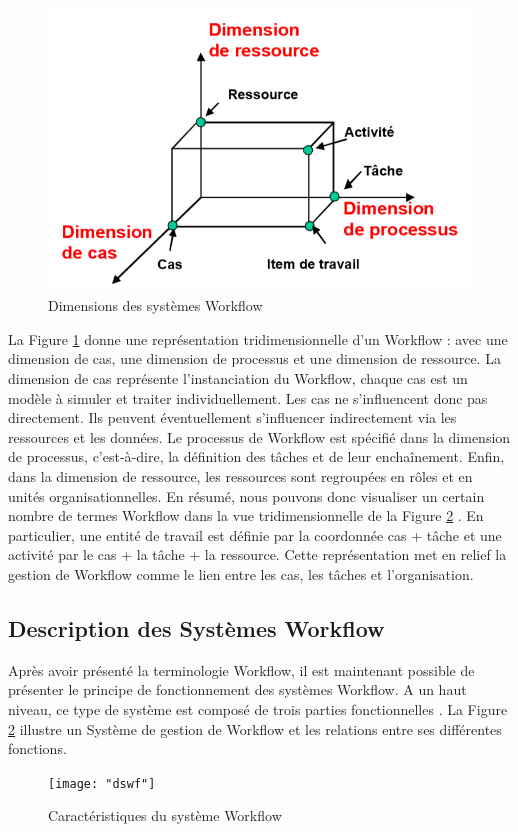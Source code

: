  	 
\begin{figure}[H]
	\centering
	\includegraphics[width=0.5\linewidth]{images/DimensionsWF}
	\caption{ Dimensions des systèmes Workflow }
	\label{fig:dimensionswf}
\end{figure}
 	 La Figure \ref{fig:dimensionswf} donne une représentation tridimensionnelle d’un Workflow : avec une dimension de cas, une dimension de processus et une dimension de ressource. La dimension de cas représente l’instanciation du Workflow, chaque cas est un modèle à simuler et traiter individuellement. Les cas ne s’influencent donc pas directement. Ils peuvent éventuellement s’influencer indirectement via les ressources et les données. Le processus de Workflow est spécifié dans la dimension de processus, c’est-à-dire, la définition des tâches et de leur enchaînement. Enfin, dans la dimension de ressource, les ressources sont regroupées en rôles et en unités organisationnelles. En résumé, nous pouvons donc visualiser un certain nombre de termes Workflow dans la vue tridimensionnelle de la Figure \ref{fig:dswf} . En particulier, une entité de travail est définie par la coordonnée cas + tâche et une activité par le cas + la tâche + la ressource.
 	  Cette représentation met en relief la gestion de Workflow comme le lien entre les cas, les tâches et l’organisation. 
 	 
 	 \subsection{Description des Systèmes Workflow }
 	 Après avoir présenté la terminologie Workflow, il est maintenant possible de présenter le principe de fonctionnement des systèmes Workflow. A un haut niveau, ce type de système est composé de trois parties fonctionnelles \parencite{WFMC11}. La Figure \ref{fig:dswf} illustre un Système de gestion de Workflow et les relations entre ses différentes fonctions. 
 	 
 	 
 	 
 
\begin{figure}[H]
	\centering
	\texttt{[image: "dswf"]}
 
	\caption{Caractéristiques du système Workflow}
	\label{fig:dswf}
\end{figure}
